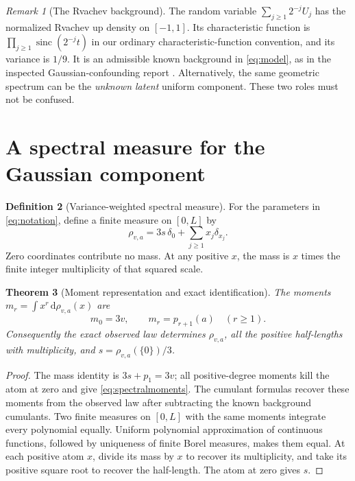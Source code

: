 \documentclass[11pt,letterpaper]{article}
\numberwithin{equation}{section}
\newtheorem{theorem}{Theorem}[section]
\theoremstyle{definition}
\newtheorem{definition}[theorem]{Definition}
\theoremstyle{remark}
\newtheorem{remark}[theorem]{Remark}
\newcommand{\sinc}{\operatorname{sinc}}
\newcommand{\dd}{\,\mathrm d}
\begin{document}
\begin{remark}[The Rvachev background]
The random variable $\sum_{j\ge1}2^{-j}U_j$ has the normalized Rvachev
up density on $[-1,1]$. Its characteristic function is
$\prod_{j\ge1}\sinc(2^{-j}t)$ in our ordinary characteristic-function
convention, and its variance is $1/9$. It is an admissible known background
in \eqref{eq:model}, as in the inspected Gaussian-confounding report
\cite{gaussian}. Alternatively, the same geometric spectrum can be the
\emph{unknown latent} uniform component. These two roles must not be confused.
\end{remark}

\section{A spectral measure for the Gaussian component}
\label{sec:spectral}

\begin{definition}[Variance-weighted spectral measure]
For the parameters in \eqref{eq:notation}, define a finite measure on $[0,L]$ by
\begin{equation}
 \rho_{v,a}=3s\,\delta_0+\sum_{j\ge1}x_j\delta_{x_j}.
 \label{eq:spectral}
\end{equation}
Zero coordinates contribute no mass. At any positive $x$, the mass is $x$
times the finite integer multiplicity of that squared scale.
\end{definition}

\begin{theorem}[Moment representation and exact identification]
\label{thm:spectral}
The moments $m_r=\int x^r\dd\rho_{v,a}(x)$ are
\begin{equation}
 m_0=3v,\qquad m_r=p_{r+1}(a)\quad(r\ge1).
 \label{eq:spectralmoments}
\end{equation}
Consequently the exact observed law determines $\rho_{v,a}$, all the positive
half-lengths with multiplicity, and $s=\rho_{v,a}(\{0\})/3$.
\end{theorem}
\begin{proof}
The mass identity is $3s+p_1=3v$; all positive-degree moments kill the atom
at zero and give \eqref{eq:spectralmoments}. The cumulant formulas recover
these moments from the observed law after subtracting the known background
cumulants. Two finite measures on $[0,L]$ with the same moments integrate
every polynomial equally. Uniform polynomial approximation of continuous
functions, followed by uniqueness of finite Borel measures, makes them equal.
At each positive atom $x$, divide its mass by $x$ to recover its multiplicity,
and take its positive square root to recover the half-length. The atom at
zero gives $s$.
\end{proof}
\end{document}
